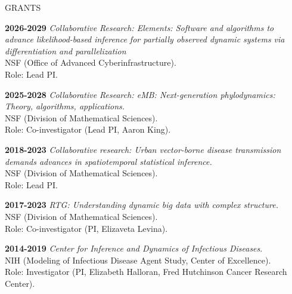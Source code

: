 \begin{mylist} {GRANTS}

\item{\bf 2026-2029} {\em Collaborative Research: Elements: Software and algorithms to advance likelihood-based inference for partially observed dynamic systems via differentiation and parallelization}\\
NSF (Office of Advanced Cyberinfrastructure).\\
Role: Lead PI.

  
\item{\bf 2025-2028} {\em Collaborative Research: eMB: Next-generation phylodynamics: Theory, algorithms, applications.}\\
  NSF (Division of Mathematical Sciences). \\
Role: Co-investigator (Lead PI, Aaron King). 
  
\item{\bf 2018-2023} {\em Collaborative research: Urban vector-borne disease transmission demands advances in spatiotemporal statistical inference.}\\
NSF (Division of Mathematical Sciences).\\
Role: Lead PI.


\item{\bf 2017-2023 } {\em RTG: Understanding dynamic big data with complex structure.} 
\\
NSF (Division of Mathematical Sciences). 
\\
Role: Co-investigator (PI, Elizaveta Levina).

  
\item{\bf 2014-2019 } {\em Center for Inference and Dynamics of Infectious Diseases}.
\\
NIH (Modeling of Infectious Disease Agent Study, Center of Excellence). 
\\
Role: Investigator (PI, Elizabeth Halloran, Fred Hutchinson Cancer Research Center).


\end{mylist}
